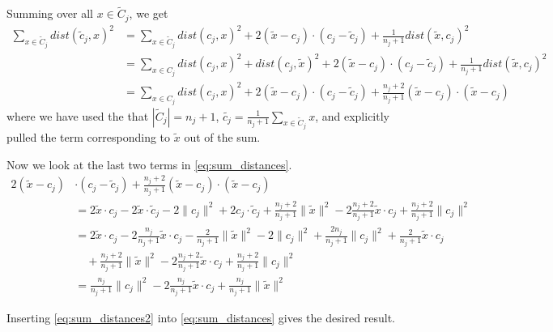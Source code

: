 \documentclass[11pt]{article}
\begin{document}
    Summing over all $x \in \tilde{C}_j$, we get
    \begin{align}
      \sum_{x \in \tilde{C}_j} dist( \tilde{c}_j, x )^2 &= \sum_{x \in \tilde{C}_j} dist(c_j, x)^2 + 2 (\tilde{x} - c_j) \cdot (c_j - \tilde{c}_j) +
      \frac{1}{n_j + 1} dist( \tilde{x}, c_j )^2 \nonumber \\
      &= \sum_{x \in C_j} dist(c_j, x)^2 + dist(c_j, \tilde{x})^2 + 2 (\tilde{x} - c_j) \cdot (c_j - \tilde{c}_j) +
      \frac{1}{n_j + 1} dist( \tilde{x}, c_j )^2 \nonumber \\
      &= \sum_{x \in C_j} dist(c_j, x)^2 + 2(\tilde{x} - c_j) \cdot (c_j - \tilde{c}_j) + \frac{n_j + 2}{n_j + 1} (\tilde{x} - c_j) \cdot
      (\tilde{x} - c_j)
      \label{eq:sum_distances}
    \end{align}
    where we have used the that $|\tilde{C}_j| = n_j + 1$, $\tilde{c_j} = \frac{1}{n_j + 1} \sum_{x \in \tilde{C}_j} x$, and explicitly pulled the
    term corresponding to $\tilde{x}$ out of the sum.

    Now we look at the last two terms in \eqref{eq:sum_distances}.
    \begin{align}
      2 (\tilde{x} - c_j) &\cdot (c_j - \tilde{c}_j ) + \frac{n_j + 2}{n_j + 1} (\tilde{x} - c_j) \cdot (\tilde{x} - c_j) \nonumber \\
      &= 2 \tilde{x} \cdot c_j - 2 \tilde{x} \cdot \tilde{c}_j - 2 \|c_j\|^2 + 2 c_j \cdot \tilde{c}_j + \frac{n_j + 2}{n_j + 1} \|\tilde{x}\|^2 - 2
      \frac{n_j + 2}{n_j + 1} \tilde{x} \cdot c_j + \frac{n_j + 2}{n_j + 1} \|c_j\|^2 \nonumber \\
      &= 2 \tilde{x} \cdot c_j - 2 \frac{n_j}{n_j + 1} \tilde{x} \cdot c_j - \frac{2}{n_j + 1} \|\tilde{x}\|^2 - 2 \|c_j\|^2 + \frac{2 n_j}{n_j + 1}
      \|c_j\|^2 + \frac{2}{n_j + 1} \tilde{x} \cdot c_j \nonumber \\
      &\quad + \frac{n_j + 2}{n_j + 1} \| \tilde{x} \|^2 - 2 \frac{n_j + 2}{n_j + 1} \tilde{x} \cdot c_j + \frac{n_j+2}{n_j+1} \|c_j\|^2 \nonumber \\
      &= \frac{n_j}{n_j + 1} \| c_j \|^2 - 2 \frac{n_j}{n_j + 1} \tilde{x} \cdot c_j + \frac{n_j}{n_j + 1} \|\tilde{x}\|^2
      \label{eq:sum_distances2}
    \end{align}

    Inserting \eqref{eq:sum_distances2} into \eqref{eq:sum_distances} gives the desired result.
\end{document}
